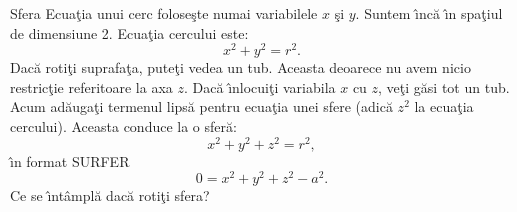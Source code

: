 \begin{surferPage}[Sfera]{Sfera}
Ecua\c tia unui cerc folose\c ste numai variabilele $x$ \c si $y$. Suntem \^\i nc\u a \^\i n spa\c tiul de dimensiune 2. Ecua\c tia cercului este:
\[x^2+y^2=r^2.\]
Dac\u a roti\c ti suprafa\c ta, pute\c ti vedea un tub. Aceasta deoarece nu avem nicio restric\c tie referitoare la axa $z$. Dac\u a \^\i nlocui\c ti variabila $x$ cu $z$, ve\c ti g\u asi tot un tub.\\
Acum ad\u auga\c ti termenul lips\u a pentru ecua\c tia unei sfere (adic\u a $z^2$ la ecua\c tia cercului). Aceasta conduce la o sfer\u a:
\[x^2+y^2+z^2=r^2,\]
\^\i n format SURFER
\[0=x^2+y^2+z^2-a^2.\]
Ce se \^\i nt\^ampl\u a dac\u a roti\c ti sfera?
\end{surferPage}